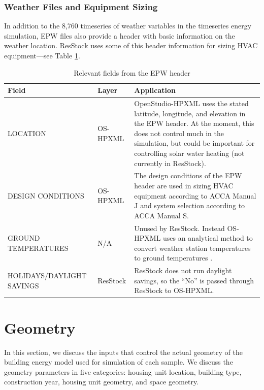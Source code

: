 \subsubsection{Weather Files and Equipment Sizing}
In addition to the 8,760 timeseries of weather variables in the timeseries energy simulation, EPW files also provide a header with basic information on the weather location. ResStock uses some of this header information for sizing HVAC equipment---see Table \ref{Tab:Packages}. 

\begin{table}[!h]
 \centering
    \caption{Relevant fields from the EPW header}
    \label{Tab:Packages}
    \begin{tabular}{llp{}}
      \toprule
      Field          & Layer & Application                                                                           \\
      \midrule
      LOCATION &     OS-HPXML &                  OpenStudio-HPXML uses the stated latitude, longitude, and elevation in the EPW header. At the moment, this does not control much in the simulation, but could be important for controlling solar water heating (not currently in ResStock). \\
      DESIGN CONDITIONS  & OS-HPXML                      & The design conditions of the EPW header are used in sizing HVAC equipment according to ACCA Manual J and system selection according to ACCA Manual S.\\                                          
      GROUND TEMPERATURES  & N/A                      & Unused by ResStock. Instead OS-HPXML uses an analytical method to convert weather station temperatures to ground temperatures \citep{Xing2014}. \\
      HOLIDAYS/DAYLIGHT SAVINGS  & ResStock                      & ResStock does not run daylight savings, so the ``No'' is passed through ResStock to OS-HPXML. \\
      \bottomrule
    \end{tabular}
  \end{table}
\section{Geometry}

In this section, we discuss the inputs that control the actual geometry of the building energy model used for simulation of each sample. We discuss the geometry parameters in five categories: housing unit location, building type, construction year, housing unit geometry, and space geometry. 

